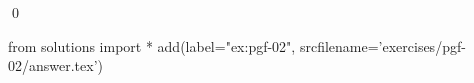 
\begin{ex} 
  \label{ex:pgf-02}
  
  \qed
\end{ex} 
\begin{python0}
from solutions import *
add(label="ex:pgf-02",
    srcfilename='exercises/pgf-02/answer.tex') 
\end{python0}
